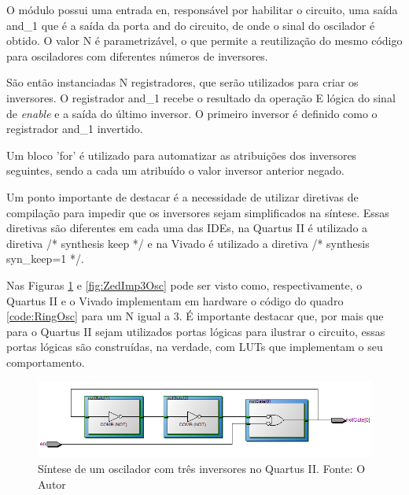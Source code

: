 O módulo possui uma entrada en, responsável por habilitar o circuito, uma saída and\_1 que é a saída da porta and do circuito, de onde o sinal do oscilador é obtido. O valor N é parametrizável, o que permite a reutilização do mesmo código para osciladores com diferentes números de inversores.

São então instanciadas N registradores, que serão utilizados para criar os inversores. O registrador and\_1 recebe o resultado da operação E lógica do sinal de \textit{enable} e a saída do último inversor. O primeiro inversor é definido como o registrador and\_1 invertido.

Um bloco 'for' é utilizado para automatizar as atribuições dos inversores seguintes, sendo a cada um atribuído o valor inversor anterior negado.

Um ponto importante de destacar é a necessidade de utilizar diretivas de compilação para impedir que os inversores sejam simplificados na síntese. Essas diretivas são diferentes em cada uma das IDEs, na Quartus II é utilizado a diretiva /* synthesis keep */ e na Vivado é utilizado a diretiva /* synthesis syn\_keep=1 */.


Nas Figuras \ref{fig:DE2Imp3Osc} e \ref{fig:ZedImp3Osc} pode ser visto como, respectivamente, o Quartus II e o Vivado implementam em hardware o código do quadro \ref{code:RingOsc} para um N igual a 3. É importante destacar que, por mais que para o Quartus II sejam utilizados portas lógicas para ilustrar o circuito, essas portas lógicas são construídas, na verdade, com LUTs que implementam o seu comportamento.

\begin{figure}[H]
    \centering
    \includegraphics[width=\linewidth]{figures/Metodologia/DE2_Implementation_3Inverter_Gates.png}
    \caption{Síntese de um oscilador com três inversores no Quartus II. Fonte: O Autor}
    \label{fig:DE2Imp3Osc}
\end{figure}

